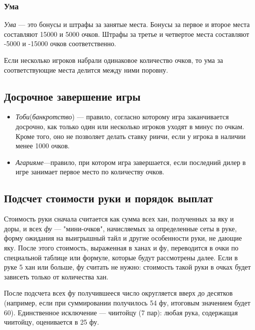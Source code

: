 \subsubsection{Ума}


\textit{Ума} --- это бонусы и штрафы за занятые места. 
Бонусы за первое и второе места составляют 15000 и 5000 очков. Штрафы за третье и четвертое места составляют -5000 и -15000 очков соответственно. 
 
Если несколько игроков набрали одинаковое количество очков, то ума за соответствующие места делится между ними поровну.

\subsection{Досрочное завершение игры}
\begin{additional}

\begin{itemize}
\item \textit{Тоби}(\textit{банкротство}) --- правило, согласно которому игра заканчивается досрочно, как только один или несколько игроков уходят в минус по очкам. Кроме того, оно не позволяет делать ставку риичи, если у игрока в наличии менее 1000 очков. 

\item \textit{Агарияме}---правило, при котором игра завершается, если последний дилер в игре занимает первое место по количеству очков.
\end{itemize}
\end{additional}

\subsection{Подсчет стоимости руки и порядок выплат}

Стоимость руки сначала считается как сумма всех хан, полученных за яку и доры, и всех \textit{фу} --- "мини-очков", начисляемых за определенные сеты в руке, форму ожидания на выигрышный тайл и другие особенности руки, не дающие яку. После этого стоимость, выраженная в ханах и фу, переводится в очки по специальной таблице или формуле, которые будут рассмотрены далее. Если в руке 5 хан или больше, фу считать не нужно: стоимость такой руки в очках будет зависеть только от количества хан.

 После подсчета всех фу получившееся число округляется вверх до десятков (например, если при суммировании получилось 54 фу, итоговым значением будет 60). Единственное исключение --- чиитойцу (7 пар): любая рука, содержащая чиитойцу, оценивается в 25 фу.

